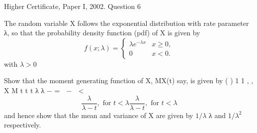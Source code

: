 \documentclass[a4paper,12pt]{article}
\begin{document}
Higher Certificate, Paper I, 2002. Question 6
\begin{framed}
The random variable X follows the exponential distribution with rate
parameter λ, so that the probability density function (pdf) of X is given by
\[f(x;\lambda) = \begin{cases} \lambda e^{-\lambda x} & x \ge 0, \\ 0 & x < 0. \end{cases}\]
with $\lambda >0$


Show that the moment generating function of X, MX(t) say, is given by
( )
1
1 , , X
M t t t λ
λ
− =  −  <  
\[ {\displaystyle {\frac {\lambda }{\lambda -t}},{\text{ for }}t<\lambda }  \frac{\lambda}{\lambda-t}, \text{ for } t < \lambda \]
and hence show that the mean and variance of X are given by $1/\lambda$
λ
and $1/\lambda^2$
respectively.
\end{framed}
\end{document}
